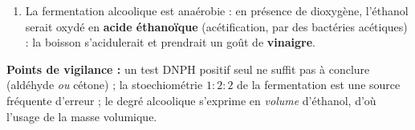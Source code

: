 \documentclass[11pt]{article}
\newcommand{\cle}[1]{{\popxbold\color{popdark}#1}}
\begin{document}
\begin{corrige}
\begin{enumerate}
\begin{enumerate}
Degré alcoolique : $\dfrac{291}{2500} \times 100 \approx \boxed{11{,}6\ \%}$ en volume, soit environ $11{,}6$ degrés.
\item La fermentation alcoolique est \cle{anaérobie} : en présence de dioxygène, l'éthanol serait oxydé en \textbf{acide éthanoïque} (acétification, par des bactéries acétiques) : la boisson s'acidulerait et prendrait un goût de \textbf{vinaigre}.
\end{enumerate}
\end{enumerate}
\textbf{Points de vigilance :} un test DNPH positif seul ne suffit pas à conclure (aldéhyde \emph{ou} cétone) ; la stoechiométrie $1:2:2$ de la fermentation est une source fréquente d'erreur ; le degré alcoolique s'exprime en \emph{volume} d'éthanol, d'où l'usage de la masse volumique.
\end{corrige}
\end{document}

